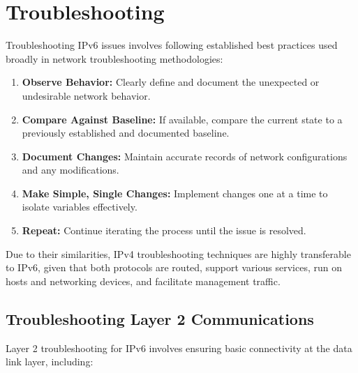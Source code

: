 \documentclass[
]{article}
\providecommand{\tightlist}{%
  \setlength{\itemsep}{0pt}\setlength{\parskip}{0pt}}
\begin{document}
\pagebreak

\section{Troubleshooting}\label{troubleshooting}

Troubleshooting IPv6 issues involves following established best
practices used broadly in network troubleshooting methodologies:

\begin{enumerate}
\def\labelenumi{\arabic{enumi}.}
\tightlist
\item
  \textbf{Observe Behavior:} Clearly define and document the unexpected
  or undesirable network behavior.
\item
  \textbf{Compare Against Baseline:} If available, compare the current
  state to a previously established and documented baseline.
\item
  \textbf{Document Changes:} Maintain accurate records of network
  configurations and any modifications.
\item
  \textbf{Make Simple, Single Changes:} Implement changes one at a time
  to isolate variables effectively.
\item
  \textbf{Repeat:} Continue iterating the process until the issue is
  resolved.
\end{enumerate}

Due to their similarities, IPv4 troubleshooting techniques are highly
transferable to IPv6, given that both protocols are routed, support
various services, run on hosts and networking devices, and facilitate
management traffic.

\subsection{Troubleshooting Layer 2
Communications}\label{troubleshooting-layer-2-communications}

Layer 2 troubleshooting for IPv6 involves ensuring basic connectivity at
the data link layer, including:
\end{document}
